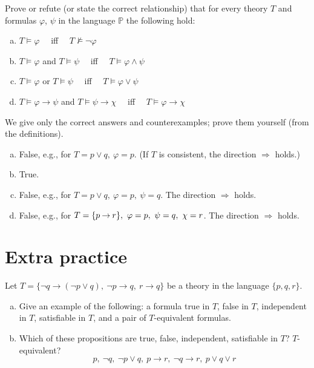 \begin{problem}

    Prove or refute (or state the correct relationship) that for every theory $T$ and formulas $\varphi$, $\psi$ in the language $\mathbb{P}$ the following hold:
    \begin{enumerate}[(a)]
        \item $T \models \varphi$ \ \ iff \ \ $T \not\models \neg \varphi$
        \item $T \models \varphi$ and $T \models \psi$ \ \ iff \ \ $T \models \varphi \wedge \psi$
        \item $T \models \varphi$ or $T \models \psi$ \ \ iff \ \ $T \models \varphi \vee \psi$
        \item $T \models \varphi \to \psi$ and $T \models \psi \to \chi$ \ \ iff \ \ $T \models \varphi \to \chi$
    \end{enumerate}

    \begin{solution} 
        We give only the correct answers and counterexamples; prove them yourself (from the definitions).      
        \begin{enumerate}[(a)]
            \item False, e.g., for $T=p\lor q,\ \varphi=p$. (If $T$ is consistent, the direction $\Rightarrow$ holds.)
            \item True.
            \item False, e.g., for $T=p\lor q,\ \varphi=p,\ \psi=q$. The direction $\Rightarrow$ holds.
            \item False, e.g., for $T=\{p\limplies r\},\ \varphi=p,\ \psi=q,\ \chi=r$. The direction $\Rightarrow$ holds. 
        \end{enumerate}              
    \end{solution}
    
\end{problem}



\section*{Extra practice}


\begin{problem}
        
    Let $T=\{\neg q \to (\neg p \vee q),\ \neg p \to q,\ r \to q\}$ be a theory in the language $\{p, q, r\}$.
    \begin{enumerate}[(a)]
        \item Give an example of the following: a formula true in $T$, false in $T$, independent in $T$, satisfiable in $T$, and a pair of $T$-equivalent formulas.
        \item Which of these propositions are true, false, independent, satisfiable in $T$? $T$-equivalent? 
        $$
        p, \ \neg q, \ \neg p\vee q, \ p\to r,\ \neg q\to r, \ p\vee q\vee r
        $$
    \end{enumerate}

\end{problem}


